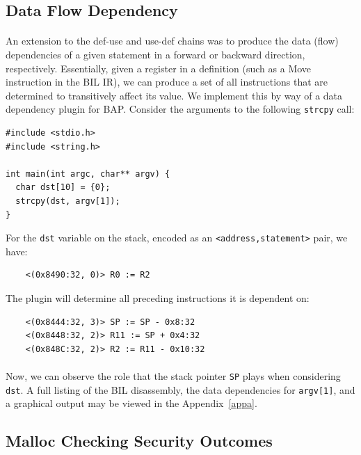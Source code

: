 \documentclass[letterpaper,11pt]{article}
\begin{document}
\subsection{Data Flow Dependency}

\paragraph{}
An extension to the def-use and use-def chains was to produce the data (flow)
dependencies of a given statement in a forward or backward direction,
respectively. Essentially, given a register in a definition (such as a Move
instruction in the BIL IR), we can produce a set of all instructions that are
determined to transitively affect its value. We implement this
by way of a data dependency plugin for BAP. Consider the arguments to the
following \texttt{strcpy} call:

\begin{center}
\lstset{language=C, label=strcpy,
caption=strcpy.c, breaklines=true, basicstyle=\tiny, numbers=none}
\begin{lstlisting}
#include <stdio.h>
#include <string.h>

int main(int argc, char** argv) {
  char dst[10] = {0};
  strcpy(dst, argv[1]);
}
\end{lstlisting}
\end{center}

For the \texttt{dst} variable on the stack, encoded as an
\texttt{<address,statement>} pair, we have:

\begin{verbatim}
    <(0x8490:32, 0)> R0 := R2
\end{verbatim}

The plugin will determine all preceding instructions it is dependent on:
\begin{verbatim}
    <(0x8444:32, 3)> SP := SP - 0x8:32
    <(0x8448:32, 2)> R11 := SP + 0x4:32
    <(0x848C:32, 2)> R2 := R11 - 0x10:32
\end{verbatim}

\paragraph{}
Now, we can observe the role that the stack pointer \texttt{SP} plays
when considering \texttt{dst}. A full listing of the BIL disassembly,
the data dependencies for \texttt{argv[1]}, and a graphical
output may be viewed in
the Appendix~\ref{appa}.

\subsection{Malloc Checking Security Outcomes}

\end{document}
